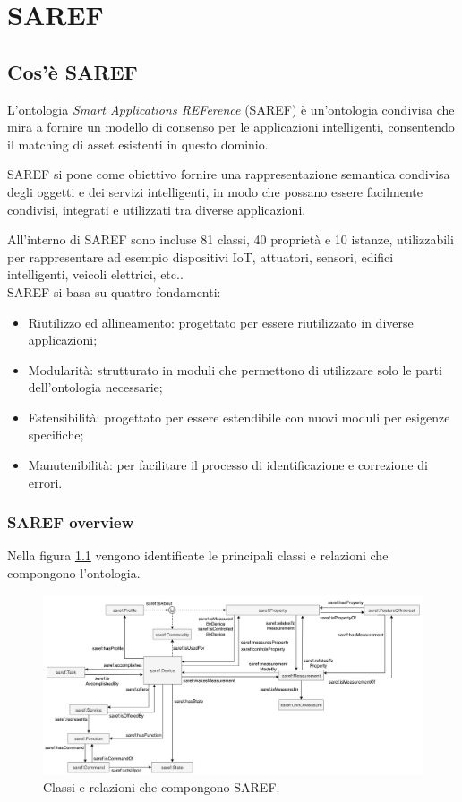 \chapter{SAREF}
\label{cap:panoramicaSaref}
\section{Cos'è SAREF}

L'ontologia \textit{Smart Applications REFerence} \cite{saref} (SAREF) è
un'ontologia
condivisa che mira a fornire un modello di consenso per le applicazioni
intelligenti, consentendo il matching di asset esistenti in questo dominio.

SAREF si pone come obiettivo fornire una rappresentazione semantica condivisa
degli oggetti e dei servizi intelligenti, in modo che possano essere facilmente
condivisi, integrati e utilizzati tra diverse applicazioni.

All'interno di SAREF sono incluse 81 classi, 40 proprietà e 10 istanze,
utilizzabili per rappresentare ad esempio dispositivi IoT, attuatori, sensori,
edifici intelligenti, veicoli elettrici, etc..\\

SAREF si basa su quattro fondamenti:
\begin{itemize}
      \item Riutilizzo ed allineamento: progettato per essere riutilizzato in
            diverse applicazioni;
      \item Modularità: strutturato in moduli che permettono di utilizzare solo
            le parti dell'ontologia necessarie;
      \item Estensibilità: progettato per essere estendibile con nuovi moduli
            per
            esigenze specifiche;
      \item Manutenibilità: per facilitare il processo di identificazione e
            correzione di errori.
\end{itemize}

\subsection{SAREF overview}
Nella figura \ref{fig:saref} vengono identificate le principali classi e
relazioni che compongono l'ontologia.
\begin{figure}[!ht]
      \centering
      \includegraphics[width=13cm]{figures/saref.png}
      \caption{Classi e relazioni che compongono SAREF.}
      \label{fig:saref}
\end{figure}

